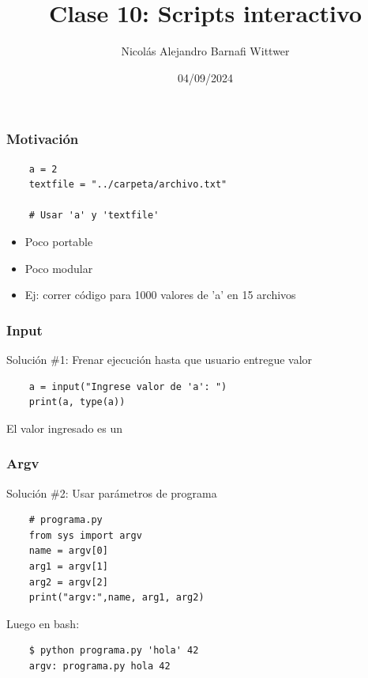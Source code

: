 \documentclass[14pt,aspectratio=169,xcolor=dvipsnames]{beamer}
\title[short title]{Clase 10: Scripts interactivo}
\subtitle{}
\author[NA Barnafi] {Nicolás Alejandro Barnafi Wittwer}
\institute[UC|CMM] 
{
    Pontificia Universidad Católica de Chile \\
    Centro de Modelamiento Matemático
}
\date{04/09/2024}
\begin{document}
\begin{frame}
    \maketitle
\end{frame}
\begin{frame}[fragile]\frametitle{Motivación}
    \begin{verbatim}
    a = 2
    textfile = "../carpeta/archivo.txt"
    
    # Usar 'a' y 'textfile'
    \end{verbatim}
    \begin{itemize}
        \item Poco portable
        \item Poco modular
        \item Ej: correr código para 1000 valores de 'a' en 15 archivos
    \end{itemize}

\pause {}
\end{frame}
\begin{frame}[fragile]\frametitle{Input}
    Solución \#1: Frenar ejecución hasta que usuario entregue valor
    
    \begin{verbatim}
    a = input("Ingrese valor de 'a': ")
    print(a, type(a))
    \end{verbatim}

    \vspace{1cm}
    El valor ingresado es un 
\end{frame}
\begin{frame}[fragile]\frametitle{Argv}
    Solución \#2: Usar parámetros de programa
    \begin{verbatim}
    # programa.py
    from sys import argv
    name = argv[0]
    arg1 = argv[1]
    arg2 = argv[2]
    print("argv:",name, arg1, arg2)
    \end{verbatim}

    Luego en bash:
    \begin{verbatim}
    $ python programa.py 'hola' 42
    argv: programa.py hola 42
    \end{verbatim}
\end{frame}
\end{document}
